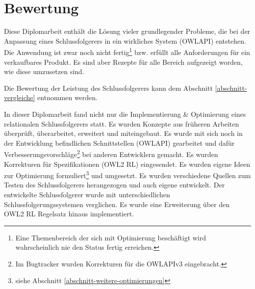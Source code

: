 \chapter{Bewertung}
Diese Diplomarbeit enthält die Lösung vieler grundlegender Probleme, die bei der Anpassung eines Schlussfolgerers in ein wirkliches System (OWLAPI) entstehen. Die Anwendung ist zwar noch nicht fertig\footnote{Eine Themenbereich der sich mit Optimierung beschäftigt wird wahrscheinlich nie den Status fertig erreichen.} bzw. erfüllt alle Anforderungen für ein verkaufbares Produkt. Es sind aber Rezepte für alle Bereich aufgezeigt worden, wie diese umzusetzen sind.

Die Bewertung der Leistung des Schlussfolgerers kann dem Abschnitt \ref{abschnitt-vergleiche} entnommen werden.

In dieser Diplomarbeit fand nicht nur die Implementierung \& Optimierung eines relationalen Schlussfolgerers statt. Es wurden Konzepte aus früheren Arbeiten überprüft, überarbeitet, erweitert und miteingebaut. Es wurde mit sich noch in der Entwicklung befindlichen Schnittstellen (OWLAPI) gearbeitet und dafür Verbesserungsvorschläge\footnote{Im Bugtracker wurden Korrekturen für die OWLAPIv3 eingebracht.} bei anderen Entwicklern gemacht. Es wurden Korrekturen für Spezifikationen (OWL2 RL) eingesendet. Es wurden eigene Ideen zur Optimierung formuliert\footnote{siehe Abschnitt \ref{abschnitt-weitere-optimierungen}} und umgesetzt. Es wurden verschiedene Quellen zum Testen des Schlussfolgerers herangezogen und auch eigene entwickelt. Der entwickelte Schlussfolgerer wurde mit unterschiedlichen Schlussfolgerungssystemen verglichen. Es wurde eine Erweiterung über den OWL2 RL Regelsatz hinaus implementiert.

